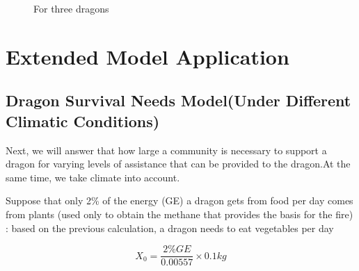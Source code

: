 \begin{figure}[htbp]
    \centering
    \caption{For three dragons}
    \label{fig:3条龙}
\end{figure}



\section{Extended Model Application}

\subsection[Dragon Survival Needs Model]{Dragon Survival Needs Model(Under Different Climatic Conditions)}

Next, we will answer that how large a community is necessary to support a dragon for varying levels of assistance that can be provided to the dragon.At the same time, we take climate into account.

Suppose that only 2\% of the energy (GE) a dragon gets from food per day comes from plants (used only to obtain the methane that provides the basis for the fire) : based on the previous calculation, a dragon needs to eat vegetables per day

\[X_0=\frac{2\%GE}{0.00557} \times 0.1 kg\]

